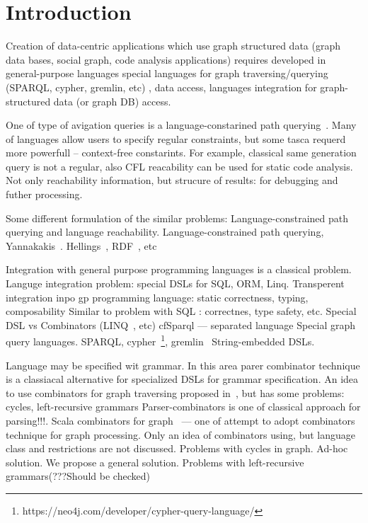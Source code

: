 \section{Introduction}

Creation of data-centric applications which use graph structured data (graph data bases, social graph, code analysis applications) requires 
developed in general-purpose languages 
special languages for graph traversing/querying (SPARQL, cypher, gremlin, etc)
, data access, languages integration for graph-structured data (or graph DB) access.

One of type of avigation queries is a language-constarined path querying~\cite{!!!}.
Many of languages allow users to specify regular constraints, but some tasca requerd more powerfull -- context-free constarints.
For example, classical same generation query is not a regular, also CFL reacability can be used for static code analysis.
Not only reachability information, but strucure of results: for debugging and futher processing.


Some different formulation of the similar problems: Language-constrained path querying and language reachability.
Language-constrained path querying, Yannakakis~\cite{Yannakakis}. 
Hellings~\cite{ConjCFPathQuery, Hellings16}, RDF~\cite{CFGonRDF}, etc~\cite{QueryGraphWithData, RegularDBQuery, GraphQueryWithEarley, FLCpathProblem, graphDB}


Integration with general purpose programming languages is a classical problem.
Languge integration problem: special DSLs for SQL, ORM, Linq.
Transperent integration inpo gp programming language: static correctness, typing, composability
Similar to problem with SQL : correctnes, type safety, etc. Special DSL vs Combinators (LINQ~\cite{LINQ1, LINQ2}, etc)
cfSparql --- separated language
Special graph query languages. SPARQL, cypher~\footnote{https://neo4j.com/developer/cypher-query-language/}, gremlin~\cite{gremlin}
String-embedded DSLs.


Language may be specified wit grammar.
In this area parer combinator technique is a classiacal alternative for specialized DSLs for grammar specification. 
An idea to use combinators for graph traversing proposed in~\cite{ScalaGraphParsing}, but has some problems: cycles, left-recursive grammars
Parser-combinators is one of classical approach for parsing!!!.
Scala combinators for graph~\cite{ScalaGraphParsing} --- one of attempt to adopt combinators technique for graph processing.
Only an idea of combinators using, but language class and restrictions are not discussed.
Problems with cycles in graph. 
Ad-hoc solution. We propose a general solution.
Problems with left-recursive grammars(???Should be checked)

